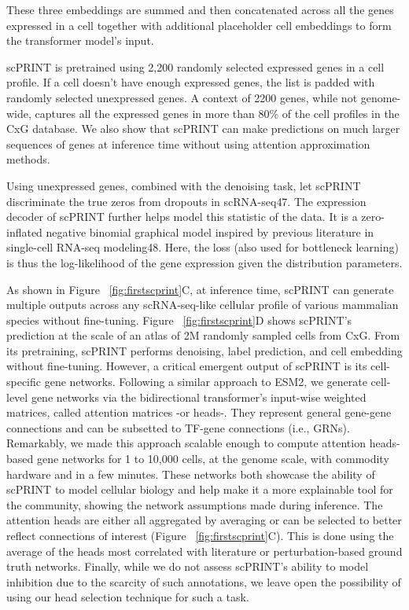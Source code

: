 These three embeddings are summed and then concatenated across all the genes expressed in a cell together with additional placeholder cell embeddings to form the transformer model's input.

\gls{scPRINT} is pretrained using 2,200 randomly selected expressed genes in a cell profile. If a cell doesn't have enough expressed genes, the list is padded with randomly selected unexpressed genes. A context of 2200 genes, while not genome-wide, captures all the expressed genes in more than 80\% of the cell profiles in the \gls{CxG} database. We also show that \gls{scPRINT} can make predictions on much larger sequences of genes at inference time without using attention approximation methods\citep{choromanskiRethinkingAttentionPerformers2022}.

Using unexpressed genes, combined with the denoising task, let \gls{scPRINT} discriminate the true zeros from dropouts in \gls{scRNA-seq}47. The expression decoder of \gls{scPRINT} further helps model this statistic of the data. It is a zero-inflated negative binomial graphical model inspired by previous literature in single-cell \gls{RNA-seq} modeling48. Here, the loss (also used for bottleneck learning) is thus the log-likelihood of the gene expression given the distribution parameters.

As shown in Figure ~\ref{fig:firstscprint}C, at inference time, \gls{scPRINT} can generate multiple outputs across any \gls{scRNA-seq}-like cellular profile of various mammalian species without fine-tuning. Figure ~\ref{fig:firstscprint}D shows \gls{scPRINT}'s prediction at the scale of an atlas of 2M randomly sampled cells from \gls{CxG}. From its pretraining, \gls{scPRINT} performs denoising, label prediction, and cell embedding without fine-tuning. However, a critical emergent output of \gls{scPRINT} is its cell-specific gene networks. Following a similar approach to \gls{ESM}2, we generate cell-level gene networks via the bidirectional transformer's input-wise weighted matrices, called attention matrices -or heads-. They represent general gene-gene connections and can be subsetted to \gls{TF}-gene connections (i.e., \gls{GRN}s). Remarkably, we made this approach scalable enough to compute attention heads-based gene networks for 1 to 10,000 cells, at the genome scale, with commodity hardware and in a few minutes. These networks both showcase the ability of \gls{scPRINT} to model cellular biology and help make it a more explainable tool for the community, showing the network assumptions made during inference. The attention heads are either all aggregated by averaging or can be selected to better reflect connections of interest (Figure ~\ref{fig:firstscprint}C). This is done using the average of the heads most correlated with literature or perturbation-based ground truth networks. Finally, while we do not assess \gls{scPRINT}'s ability to model inhibition due to the scarcity of such annotations, we leave open the possibility of using our head selection technique for such a task. 

